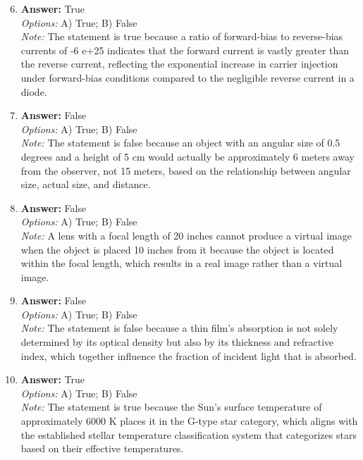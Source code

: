 \documentclass[12pt]{article}
\begin{document}
\begin{enumerate}[label=\arabic*.]
\setcounter{enumi}{5}
\item \textbf{Answer:} True
\\ \textit{Options:} A) True; B) False
\\ \textit{Note:} The statement is true because a ratio of forward-bias to reverse-bias currents of -6 e+25 indicates that the forward current is vastly greater than the reverse current, reflecting the exponential increase in carrier injection under forward-bias conditions compared to the negligible reverse current in a diode.
\item \textbf{Answer:} False
\\ \textit{Options:} A) True; B) False
\\ \textit{Note:} The statement is false because an object with an angular size of 0.5 degrees and a height of 5 cm would actually be approximately 6 meters away from the observer, not 15 meters, based on the relationship between angular size, actual size, and distance.
\item \textbf{Answer:} False
\\ \textit{Options:} A) True; B) False
\\ \textit{Note:} A lens with a focal length of 20 inches cannot produce a virtual image when the object is placed 10 inches from it because the object is located within the focal length, which results in a real image rather than a virtual image.
\item \textbf{Answer:} False
\\ \textit{Options:} A) True; B) False
\\ \textit{Note:} The statement is false because a thin film's absorption is not solely determined by its optical density but also by its thickness and refractive index, which together influence the fraction of incident light that is absorbed.
\item \textbf{Answer:} True
\\ \textit{Options:} A) True; B) False
\\ \textit{Note:} The statement is true because the Sun's surface temperature of approximately 6000 K places it in the G-type star category, which aligns with the established stellar temperature classification system that categorizes stars based on their effective temperatures.
\end{enumerate}
\end{document}
